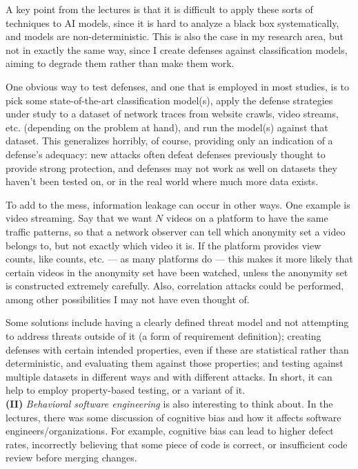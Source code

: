 \documentclass[11pt]{article}
\begin{document}
A key point from the lectures is that it is difficult to apply these sorts of techniques to AI models, since it is hard to analyze a black box systematically, and models are non-deterministic. This is also the case in my research area, but not in exactly the same way, since I create defenses against classification models, aiming to degrade them rather than make them work.

One obvious way to test defenses, and one that is employed in most studies, is to pick some state-of-the-art classification model(s), apply the defense strategies under study to a dataset of network traces from website crawls, video streams, etc. (depending on the problem at hand), and run the model(s) against that dataset. This generalizes horribly, of course, providing only an indication of a defense's adequacy: new attacks often defeat defenses previously thought to provide strong protection, and defenses may not work as well on datasets they haven't been tested on, or in the real world where much more data exists.

To add to the mess, information leakage can occur in other ways. One example is video streaming. Say that we want $N$ videos on a platform to have the same traffic patterns, so that a network observer can tell which anonymity set a video belongs to, but not exactly which video it is. If the platform provides view counts, like counts, etc. --- as many platforms do --- this makes it more likely that certain videos in the anonymity set have been watched, unless the anonymity set is constructed extremely carefully. Also, correlation attacks could be performed, among other possibilities I may not have even thought of.

Some solutions include having a clearly defined threat model and not attempting to address threats outside of it (a form of requirement definition); creating defenses with certain intended properties, even if these are statistical rather than deterministic, and evaluating them against those properties; and testing against multiple datasets in different ways and with different attacks. In short, it can help to employ property-based testing, or a variant of it. \hfill \\

\textbf{(II)} \textit{Behavioral software engineering} is also interesting to think about. In the lectures, there was some discussion of cognitive bias and how it affects software engineers/organizations. For example, cognitive bias can lead to higher defect rates, incorrectly believing that some piece of code is correct, or insufficient code review before merging changes.
\end{document}
